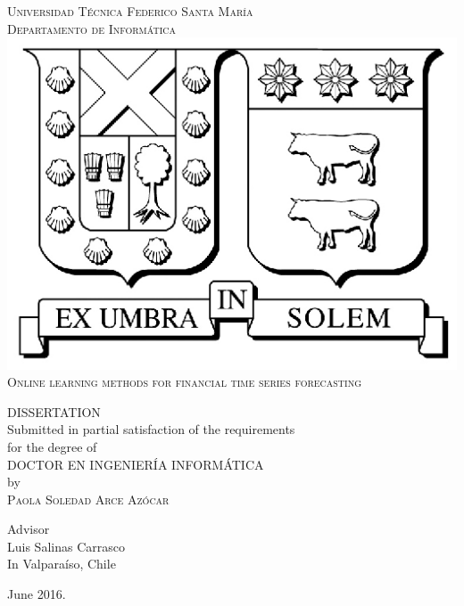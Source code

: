 \thispagestyle{empty}
\vspace{1.5in}
\begin{center}
{\textsc{Universidad T\'ecnica Federico Santa Mar\'ia}}\\
{\textsc{Departamento de Inform\'atica}}\\
\medskip
\includegraphics[scale=1]{fig/logo_usm.eps}
\bigskip
\bigskip
\bigskip
\bigskip \\
{\textsc{\Large{{Online learning methods for financial time series forecasting}}}}\\%

\bigskip
\bigskip
\bigskip
\bigskip
\bigskip 

{\MakeUppercase{Dissertation}\\
\bigskip
\bigskip
Submitted in partial satisfaction of the requirements\\
for the degree of\\
\bigskip
\bigskip
\MakeUppercase{Doctor en Ingenier\'ia Inform\'atica}\\
\bigskip
\bigskip
by\\
\bigskip
{\textsc{\large{Paola Soledad Arce Az\'ocar}}}\\
\bigskip

\bigskip
Advisor\\
Luis Salinas Carrasco\\
\bigskip
\bigskip
In Valpara\'iso, Chile}
\end{center}


\begin{center}
{\normalsize June 2016.}
\end{center}

\pagebreak

